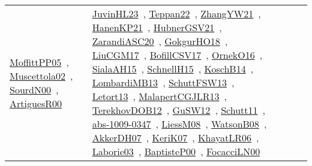 {\begin{longtable}{lp{3cm}>{\raggedright\arraybackslash}p{6cm}>{\raggedright\arraybackslash}p{6cm}>{\raggedright\arraybackslash}p{8cm}}
\href{../works/MoffittPP05.pdf}{MoffittPP05}~\cite{MoffittPP05}, \href{../works/Muscettola02.pdf}{Muscettola02}~\cite{Muscettola02}, \href{../works/SourdN00.pdf}{SourdN00}~\cite{SourdN00}, \href{../works/ArtiguesR00.pdf}{ArtiguesR00}~\cite{ArtiguesR00} & \href{../works/JuvinHL23.pdf}{JuvinHL23}~\cite{JuvinHL23}, \href{../works/Teppan22.pdf}{Teppan22}~\cite{Teppan22}, \href{../works/ZhangYW21.pdf}{ZhangYW21}~\cite{ZhangYW21}, \href{../works/HanenKP21.pdf}{HanenKP21}~\cite{HanenKP21}, \href{../works/HubnerGSV21.pdf}{HubnerGSV21}~\cite{HubnerGSV21}, \href{../works/ZarandiASC20.pdf}{ZarandiASC20}~\cite{ZarandiASC20}, \href{../works/GokgurHO18.pdf}{GokgurHO18}~\cite{GokgurHO18}, \href{../works/LiuCGM17.pdf}{LiuCGM17}~\cite{LiuCGM17}, \href{../works/BofillCSV17.pdf}{BofillCSV17}~\cite{BofillCSV17}, \href{../works/OrnekO16.pdf}{OrnekO16}~\cite{OrnekO16}, \href{../works/SialaAH15.pdf}{SialaAH15}~\cite{SialaAH15}, \href{../works/SchnellH15.pdf}{SchnellH15}~\cite{SchnellH15}, \href{../works/KoschB14.pdf}{KoschB14}~\cite{KoschB14}, \href{../works/LombardiMB13.pdf}{LombardiMB13}~\cite{LombardiMB13}, \href{../works/SchuttFSW13.pdf}{SchuttFSW13}~\cite{SchuttFSW13}, \href{../works/Letort13.pdf}{Letort13}~\cite{Letort13}, \href{../works/MalapertCGJLR13.pdf}{MalapertCGJLR13}~\cite{MalapertCGJLR13}, \href{../works/TerekhovDOB12.pdf}{TerekhovDOB12}~\cite{TerekhovDOB12}, \href{../works/GuSW12.pdf}{GuSW12}~\cite{GuSW12}, \href{../works/Schutt11.pdf}{Schutt11}~\cite{Schutt11}, \href{../works/abs-1009-0347.pdf}{abs-1009-0347}~\cite{abs-1009-0347}, \href{../works/LiessM08.pdf}{LiessM08}~\cite{LiessM08}, \href{../works/WatsonB08.pdf}{WatsonB08}~\cite{WatsonB08}, \href{../works/AkkerDH07.pdf}{AkkerDH07}~\cite{AkkerDH07}, \href{../works/KeriK07.pdf}{KeriK07}~\cite{KeriK07}, \href{../works/KhayatLR06.pdf}{KhayatLR06}~\cite{KhayatLR06}, \href{../works/Laborie03.pdf}{Laborie03}~\cite{Laborie03}, \href{../works/BaptisteP00.pdf}{BaptisteP00}~\cite{BaptisteP00}, \href{../works/FocacciLN00.pdf}{FocacciLN00}~\cite{FocacciLN00}\\

\end{longtable}}
